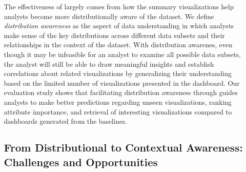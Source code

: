 \par The effectiveness of \sbd largely comes from how the summary visualizations help analysts become more distributionally aware of the dataset. We define \emph{distribution awareness} as the aspect of data understanding in which analysts make sense of the key distributions across different data subsets and their relationships in the context of the dataset. With distribution awarenes, even though it may be infeasible for an analyst to examine all possible data subsets, the analyst will still be able to draw meaningful insights and establish correlations about related visualizations by generalizing their understanding based on the limited number of visualizations presented in the dashboard. Our evaluation study shows that facilitating distribution awareness through \sbd guides analysts to make better predictions regarding unseen visualizations, ranking attribute importance, and retrieval of interesting visualizations compared to dashboards generated from the baselines. %
\subsection{From Distributional to Contextual Awareness: Challenges and Opportunities}

